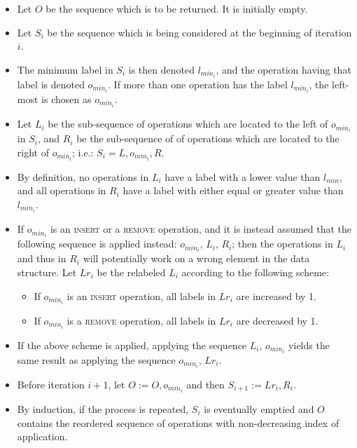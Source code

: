 \begin{itemize}
  \item Let $O$ be the sequence which is to be returned. It is initially empty.

  \item Let $S_i$ be the sequence which is being considered at the beginning of
  iteration $i$.

  \item The minimum label in $S_i$ is then denoted $l_{min_i}$, and the
  operation having that label is denoted $o_{min_i}$. If more than one operation
  has the label $l_{min_i}$, the left-most is chosen as $o_{min_i}$.

  \item Let $L_i$ be the sub-sequence of operations which are located to the
  left of $o_{min_i}$ in $S_i$, and $R_i$ be the sub-sequence of of operations
  which are located to the right of $o_{min_i}$; i.e.: $S_i = L,o_{min_i},R$.

  \item By definition, no operations in $L_i$ have a label with a lower value
  than $l_{min}$, and all operations in $R_i$ have a label with either equal or
  greater value than $l_{min_i}$.

  \item If $o_{min_i}$ is an \textsc{insert} or a \textsc{remove} operation, and
  it is instead assumed that the following sequence is applied instead:
  $o_{min_i}$, $L_i$, $R_i$; then the operations in $L_i$ and thus in $R_i$ will
  potentially work on a wrong element in the data structure. Let $Lr_i$ be the
  relabeled $L_i$ according to the following scheme:

  \begin{itemize}

    \item If $o_{min_i}$ is an \textsc{insert} operation, all labels in $Lr_i$
    are increased by 1.

    \item If $o_{min_i}$ is a \textsc{remove} operation, all labels in $Lr_i$
    are decreased by 1.

  \end{itemize}

  \item If the above scheme is applied, applying the sequence $L_i$, $o_{min_i}$
  yields the same result as applying the sequence $o_{min_i}$, $Lr_i$.

  \item Before iteration $i+1$, let $O := O, o_{min_i}$ and then $S_{i+1} :=
  Lr_i, R_i$.

  \item By induction, if the process is repeated, $S_i$ is eventually emptied
  and $O$ contains the reordered sequence of operations with non-decreasing
  index of application.

\end{itemize}

